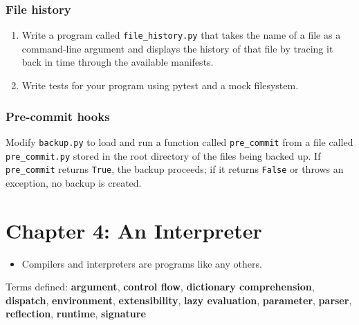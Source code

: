 \documentclass{scrbook}
\newcommand{\glossref}[1]{\textbf{#1}}
\begin{document}
\subsection*{File history}

\begin{enumerate}

\item 

Write a program called \texttt{file\_history.py}
    that takes the name of a file as a command-line argument
    and displays the history of that file
    by tracing it back in time through the available manifests.



\item 

Write tests for your program using pytest and a mock filesystem.



\end{enumerate}

\subsection*{Pre-commit hooks}


Modify \texttt{backup.py} to load and run a function called \texttt{pre\_commit} from a file called \texttt{pre\_commit.py}
stored in the root directory of the files being backed up.
If \texttt{pre\_commit} returns \texttt{True}, the backup proceeds;
if it returns \texttt{False} or throws an exception,
no backup is created.

\chapter{Chapter 4: An Interpreter}\label{interpreter}

\begin{itemize}

\item Compilers and interpreters are programs like any others.

\end{itemize}


\noindent 
    Terms defined:
    \glossref{argument}, \glossref{control flow}, \glossref{dictionary comprehension}, \glossref{dispatch}, \glossref{environment}, \glossref{extensibility}, \glossref{lazy evaluation}, \glossref{parameter}, \glossref{parser}, \glossref{reflection}, \glossref{runtime}, \glossref{signature}
\end{document}
